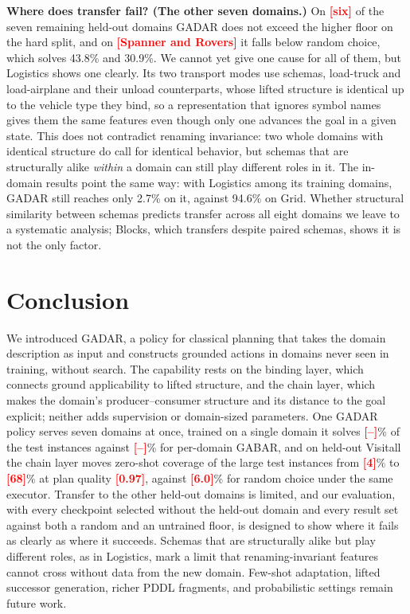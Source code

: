 \documentclass[letterpaper]{article} %
\newcommand{\gadar}{GADAR}                 %
\newcommand{\todonum}[1]{\textcolor{red}{\textbf{[#1]}}}
\begin{document}
\textbf{Where does transfer fail? (The other seven domains.)} On
\todonum{six} of the seven remaining held-out domains \gadar{} does not
exceed the higher floor on the hard split, and on \todonum{Spanner and
Rovers} it falls below random choice, which solves 43.8\% and 30.9\%. We
cannot yet give one cause for all of them, but Logistics shows one clearly.
Its two transport modes use schemas, \textsf{load-truck} and
\textsf{load-airplane} and their unload counterparts, whose lifted structure
is identical up to the vehicle type they bind, so a representation that
ignores symbol names gives them the same features even though only one
advances the goal in a given state. This does not contradict renaming
invariance: two whole domains with identical structure do call for
identical behavior, but schemas that are structurally alike \emph{within} a
domain can still play different roles in it. The in-domain results point
the same way: with Logistics among its training domains, \gadar{} still
reaches only 2.7\% on it, against 94.6\% on Grid. Whether
structural similarity between schemas predicts transfer across all eight
domains we leave to a systematic analysis; Blocks, which transfers despite
paired schemas, shows it is not the only factor.

\section{Conclusion}

We introduced \gadar{}, a policy for classical planning that takes the
domain description as input and constructs grounded actions in domains
never seen in training, without search. The capability rests on the
binding layer, which connects ground applicability to lifted structure,
and the chain layer, which makes the domain's producer--consumer structure
and its distance to the goal explicit; neither adds supervision or
domain-sized parameters. One \gadar{} policy serves seven domains at once,
trained on a single domain it solves \todonum{--}\% of the test instances
against \todonum{--}\% for per-domain GABAR, and on held-out Visitall the chain layer moves zero-shot coverage of the large
test instances from \todonum{4}\% to \todonum{68}\% at plan quality
\todonum{0.97}, against \todonum{6.0}\% for random choice under the same
executor. Transfer to the other held-out domains is limited, and our
evaluation, with every checkpoint selected without the held-out domain and
every result set against both a random and an untrained floor, is designed
to show where it fails as clearly as where it succeeds. Schemas that are
structurally alike but play different roles, as in Logistics, mark a limit
that renaming-invariant features cannot cross without data from the new
domain. Few-shot adaptation, lifted successor generation, richer PDDL
fragments, and probabilistic settings remain future work.



% 
\end{document}
